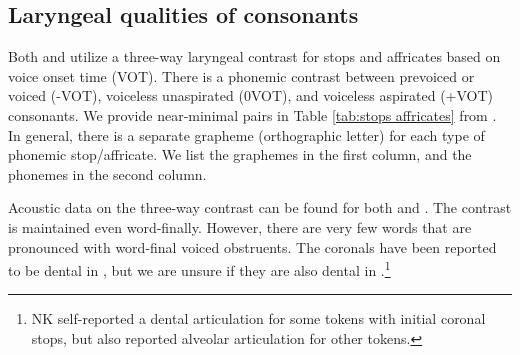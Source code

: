 


\subsection{Laryngeal qualities of consonants}\label{section:phono:segmental:laryngeal cons}

Both {\seaSE} and {\iaIA}  utilize a three-way laryngeal contrast for stops and affricates based on voice onset time (VOT). There is a phonemic contrast between prevoiced or voiced (-VOT), voiceless unaspirated (0VOT), and voiceless aspirated (+VOT) consonants. We provide near-minimal pairs in Table \ref{tab:stops affricates} from {\iaIA}.  In general, there is a separate grapheme (orthographic letter) for each type of phonemic stop/affricate. We list the graphemes in the first column, and the phonemes in the second column.

Acoustic data on the three-way contrast can be found for both {\iaIA} \citep{Hacopian-2003-ThreeWayVOTCOntrastArmenian,Amirian-2017-TehraniStudyAcousticFeaturesStopsAffricatesEasternArmenian,Toparlak-2017-MAConsonantsArmenian}  and {\seaSE} \citep{Seyfarth-2018-PlosiveVoicingAcousticsArmenian,Seyfarth-JIPAArmenian}. The contrast is maintained even word-finally. However, there are very few words that are pronounced with word-final voiced obstruents.  The coronals have been reported to be dental in {\seaSE} \citep[110]{Khachatryan-1988-ArmenianPhono}, but we are unsure if they are also dental in {\iaIA}.\footnote{NK self-reported a dental articulation for some tokens with initial coronal stops, but also reported alveolar articulation for other tokens.} 



